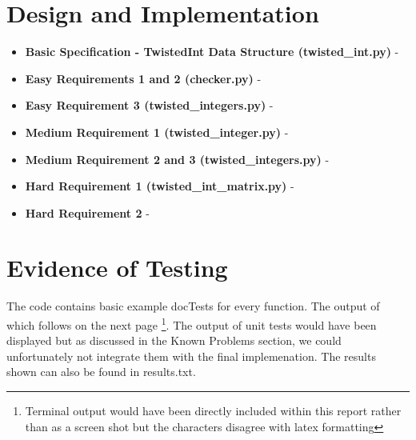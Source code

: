 \documentclass[11]{article}
\begin{document}
	\section{Design and Implementation}
		\begin{itemize}
			\item \textbf{Basic Specification - TwistedInt Data Structure (twisted\_int.py)} - 
			
			\item \textbf{Easy Requirements 1 and 2 (checker.py)} - 
			
			\item \textbf{Easy Requirement 3 (twisted\_integers.py)} - 
			
		\item \textbf{Medium Requirement 1 (twisted\_integer.py)} - 
		
		\item \textbf{Medium Requirement 2 and 3 (twisted\_integers.py)} - 
		
		\item \textbf{Hard Requirement 1 (twisted\_int\_matrix.py)} - 
		
		\item \textbf{Hard Requirement 2} - 	
		\end{itemize}
		
	\section{Evidence of Testing}	
		The code contains basic example docTests for every function. The output of which follows on the next page \footnote{Terminal output would have been directly included within this report rather than as a screen shot but the characters disagree with latex formatting}. The output of unit tests would have been displayed but as discussed in the Known Problems section, we could unfortunately not integrate them with the final implemenation. The results shown can also be found in results.txt. 
		\newpage
		
\end{document}

